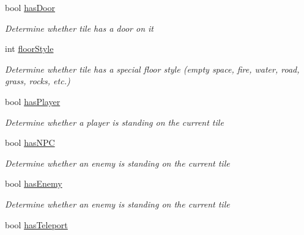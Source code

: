 \begin{DoxyCompactItemize}
bool \hyperlink{class_gruppe22_1_1_backend_1_1_floor_tile_ab92743f9c2bebd18192a91d7a1c2c194}{has\-Door}
\begin{DoxyCompactList}\small\item\em Determine whether tile has a door on it \end{DoxyCompactList}\item 
int \hyperlink{class_gruppe22_1_1_backend_1_1_floor_tile_aba100c4046831211768aeddb2851f6b2}{floor\-Style}
\begin{DoxyCompactList}\small\item\em Determine whether tile has a special floor style (empty space, fire, water, road, grass, rocks, etc.) \end{DoxyCompactList}\item 
bool \hyperlink{class_gruppe22_1_1_backend_1_1_floor_tile_a13d1616f29393cef6bebe40c140902e2}{has\-Player}
\begin{DoxyCompactList}\small\item\em Determine whether a player is standing on the current tile \end{DoxyCompactList}\item 
bool \hyperlink{class_gruppe22_1_1_backend_1_1_floor_tile_a48a520d5f87a7f53f967d332458137b2}{has\-N\-P\-C}
\begin{DoxyCompactList}\small\item\em Determine whether an enemy is standing on the current tile \end{DoxyCompactList}\item 
bool \hyperlink{class_gruppe22_1_1_backend_1_1_floor_tile_afe86d0c8424017818f04e2b0688e5c75}{has\-Enemy}
\begin{DoxyCompactList}\small\item\em Determine whether an enemy is standing on the current tile \end{DoxyCompactList}\item 
bool \hyperlink{class_gruppe22_1_1_backend_1_1_floor_tile_a477120ecb285df256f1761cd1774bf16}{has\-Teleport}

\end{DoxyCompactItemize}
